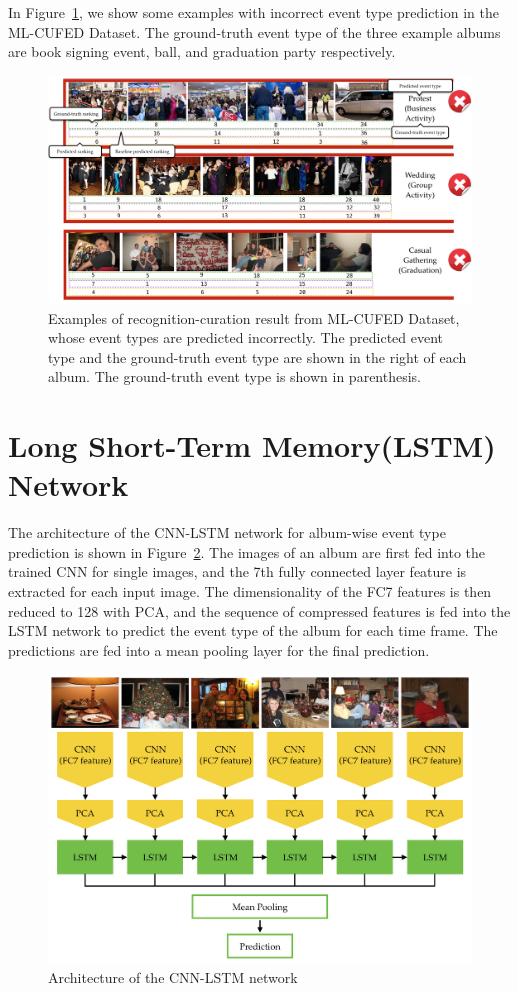 \documentclass[runningheads]{llncs}
\begin{document}
In Figure~\ref{wrong1}, we show some examples with incorrect event type prediction in the ML-CUFED Dataset. The ground-truth event type of the three example albums are book signing event, ball, and graduation party respectively.
\begin{figure}
\vspace{-0.1in}
\centering
\includegraphics[width=5in]{wrong1}
\caption{Examples of recognition-curation result from ML-CUFED Dataset, whose event types are predicted incorrectly. The predicted event type and the ground-truth event type are shown in the right of each album. The ground-truth event type is shown in parenthesis.}
\label{wrong1}
\vspace{-0.2in}
\end{figure}

\section{Long Short-Term Memory(LSTM) Network}
The architecture of the CNN-LSTM network for album-wise event type prediction is shown in Figure~\ref{LSTM}. The images of an album are first fed into the trained CNN for single images, and the 7th fully connected layer feature is extracted for each input image. The dimensionality of the FC7 features is then reduced to 128 with PCA, and the sequence of compressed features is fed into the LSTM network to predict the event type of the album for each time frame. The predictions are fed into a mean pooling layer for the final prediction.
\begin{figure}
\vspace{-0.1in}
\centering
\includegraphics[width=4.5in]{LSTM}
\caption{Architecture of the CNN-LSTM network}
\label{LSTM}
\vspace{-0.2in}
\end{figure}


%
\end{document}
